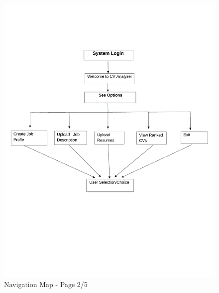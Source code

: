 \begin{figure}[h]
    \centering
    \includegraphics[width=1\linewidth,page=2]{img/diagrams/Updated_Navigation_Map_PDF.pdf}
    \caption{Navigation Map - Page 2/5}
\end{figure}

